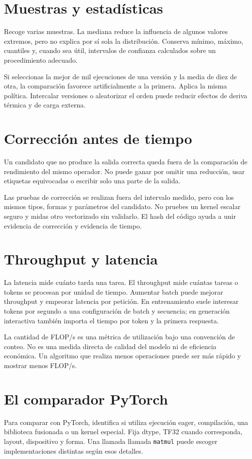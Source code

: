 \documentclass[12pt,a4paper,oneside]{report}
\begin{document}
\section{Muestras y estadísticas}
Recoge varias muestras. La mediana reduce la influencia de algunos valores extremos, pero no explica por sí sola la distribución. Conserva mínimo, máximo, cuantiles y, cuando sea útil, intervalos de confianza calculados sobre un procedimiento adecuado.

Si seleccionas la mejor de mil ejecuciones de una versión y la media de diez de otra, la comparación favorece artificialmente a la primera. Aplica la misma política. Intercalar versiones o aleatorizar el orden puede reducir efectos de deriva térmica y de carga externa.

\section{Corrección antes de tiempo}
Un candidato que no produce la salida correcta queda fuera de la comparación de rendimiento del mismo operador. No puede ganar por omitir una reducción, usar etiquetas equivocadas o escribir solo una parte de la salida.

Las pruebas de corrección se realizan fuera del intervalo medido, pero con los mismos tipos, formas y parámetros del candidato. No pruebes un kernel escalar seguro y midas otro vectorizado sin validarlo. El hash del código ayuda a unir evidencia de corrección y evidencia de tiempo.

\section{Throughput y latencia}
La latencia mide cuánto tarda una tarea. El throughput mide cuántas tareas o tokens se procesan por unidad de tiempo. Aumentar batch puede mejorar throughput y empeorar latencia por petición. En entrenamiento suele interesar tokens por segundo a una configuración de batch y secuencia; en generación interactiva también importa el tiempo por token y la primera respuesta.

La cantidad de FLOP/s es una métrica de utilización bajo una convención de conteo. No es una medida directa de calidad del modelo ni de eficiencia económica. Un algoritmo que realiza menos operaciones puede ser más rápido y mostrar menos FLOP/s.

\section{El comparador PyTorch}
Para comparar con PyTorch, identifica si utiliza ejecución eager, compilación, una biblioteca fusionada o un kernel especial. Fija dtype, TF32 cuando corresponda, layout, dispositivo y forma. Una llamada llamada \texttt{matmul} puede escoger implementaciones distintas según esos detalles.
\end{document}
